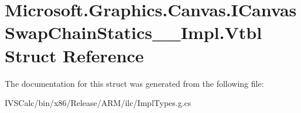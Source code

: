 \hypertarget{struct_microsoft_1_1_graphics_1_1_canvas_1_1_i_canvas_swap_chain_statics_____impl_1_1_vtbl}{}\section{Microsoft.\+Graphics.\+Canvas.\+I\+Canvas\+Swap\+Chain\+Statics\+\_\+\+\_\+\+Impl.\+Vtbl Struct Reference}
\label{struct_microsoft_1_1_graphics_1_1_canvas_1_1_i_canvas_swap_chain_statics_____impl_1_1_vtbl}


The documentation for this struct was generated from the following file\+:\begin{DoxyCompactItemize}
\item 
I\+V\+S\+Calc/bin/x86/\+Release/\+A\+R\+M/ilc/Impl\+Types.\+g.\+cs\end{DoxyCompactItemize}
